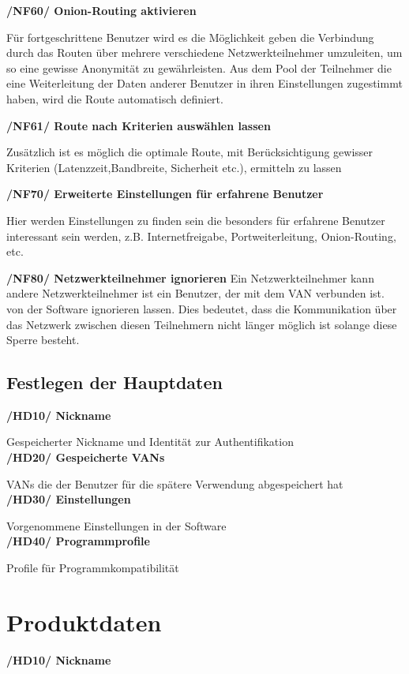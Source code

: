 \documentclass[a4paper,12pt]{scrreprt}
\begin{document}
		\textbf {/NF60/ Onion-Routing aktivieren}
		
		Für fortgeschrittene Benutzer wird es die Möglichkeit geben die Verbindung durch das Routen über mehrere verschiedene Netzwerkteilnehmer umzuleiten, um so eine gewisse Anonymität zu gewährleisten. Aus dem Pool der Teilnehmer die eine Weiterleitung der Daten anderer Benutzer in ihren Einstellungen zugestimmt haben, wird die Route automatisch definiert.
		
		\textbf {/NF61/ Route nach Kriterien auswählen lassen}
		
		Zusätzlich ist es möglich die optimale Route, mit Berücksichtigung gewisser Kriterien (Latenzzeit,Bandbreite, Sicherheit etc.), ermitteln zu lassen
		
		\textbf {/NF70/ Erweiterte Einstellungen für erfahrene Benutzer}
		
		Hier werden Einstellungen zu finden sein die besonders für erfahrene Benutzer interessant sein werden, z.B. Internetfreigabe, Portweiterleitung, Onion-Routing, etc.
		
		\textbf {/NF80/ Netzwerkteilnehmer ignorieren}	
		Ein Netzwerkteilnehmer kann andere Netzwerkteilnehmer ist ein Benutzer, der mit dem VAN verbunden ist. von der Software ignorieren lassen. Dies bedeutet, dass die Kommunikation über das Netzwerk zwischen diesen Teilnehmern nicht länger möglich ist solange diese Sperre besteht.
		
		\section{Festlegen der Hauptdaten}
		\textbf {/HD10/ Nickname}
		
		Gespeicherter Nickname und Identität zur Authentifikation\\
		\textbf {/HD20/ Gespeicherte VANs}
		
		VANs die der Benutzer für die spätere Verwendung abgespeichert hat\\
		\textbf {/HD30/ Einstellungen}
		
		Vorgenommene Einstellungen in der Software\\
		\textbf {/HD40/ Programmprofile}
		
		Profile für Programmkompatibilität
	
\chapter{Produktdaten}
	
	\textbf {/HD10/ Nickname}
	
\end{document}
